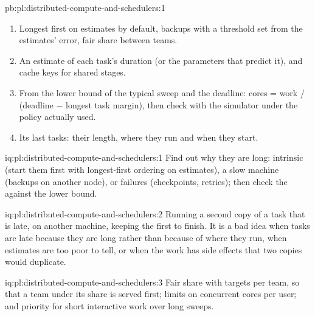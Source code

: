\begin{solution}{pb:pl:distributed-compute-and-schedulers:1}
\begin{enumerate}
longest first, 16.33 and 391.9 with ; backups after 2.5 times the estimate save longest first 1.8~hours and cost first in,
first out 0.5; the best schedule, longest first with backups, ends 5.5\% above the lower bound of 9.50~hours.
\item Longest first on estimates by default, backups with a threshold set from the estimates' error, fair share between teams.
\item An estimate of each task's duration (or the parameters that predict it), and cache keys for shared stages.
\item From the lower bound of the typical sweep and the deadline: cores = work / (deadline $-$ longest task margin), then check with the
simulator under the policy actually used.
\item Its last tasks: their length, where they run and when they start.
\end{enumerate}
\end{solution}

\begin{solution}{iq:pl:distributed-compute-and-schedulers:1}
Find out why they are long: intrinsic (start them first with longest-first ordering on estimates), a slow machine (backups on another node),
or failures (checkpoints, retries); then check the  against the lower bound.
\end{solution}

\begin{solution}{iq:pl:distributed-compute-and-schedulers:2}
Running a second copy of a task that is late, on another machine, keeping the first to finish. It is a bad idea when tasks are late because
they are long rather than because of where they run, when estimates are too poor to tell, or when the work has side effects that two copies
would duplicate.
\end{solution}

\begin{solution}{iq:pl:distributed-compute-and-schedulers:3}
Fair share with targets per team, so that a team under its share is served first; limits on concurrent cores per user; and priority for
short interactive work over long sweeps.
\end{solution}

